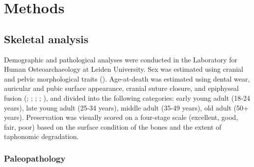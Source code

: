 \documentclass[
  11pt,
  leqno]{scrartcl}
\begin{document}
\section{Methods}\label{methods}

\subsection{Skeletal analysis}\label{skeletal-analysis}

Demographic and pathological analyses were conducted in the Laboratory
for Human Osteoarchaeology at Leiden University. Sex was estimated using
cranial and pelvic morphological traits
(). Age-at-death
was estimated using dental wear, auricular and pubic surface appearance,
cranial suture closure, and epiphyseal fusion
(;
;
;
;
), and
divided into the following categories: early young adult (18-24 years),
late young adult (25-34 years), middle adult (35-49 years), old adult
(50+ years). Preservation was visually scored on a four-stage scale
(excellent, good, fair, poor) based on the surface condition of the
bones and the extent of taphonomic degradation.

\subsubsection{Paleopathology}\label{paleopathology}
\end{document}
